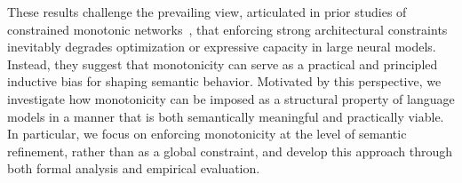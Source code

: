 \documentclass{article}
\theoremstyle{plain}
\theoremstyle{definition}
\theoremstyle{remark}
\begin{document}

These results challenge the prevailing view, articulated in prior studies of constrained monotonic networks~\cite{sartor2025advancing}, that enforcing strong architectural constraints inevitably degrades optimization or expressive capacity in large neural models. Instead, they suggest that monotonicity can serve as a practical and principled inductive bias for shaping semantic behavior. Motivated by this perspective, we investigate how monotonicity can be imposed as a structural property of language models in a manner that is both semantically meaningful and practically viable. In particular, we focus on enforcing monotonicity at the level of semantic refinement, rather than as a global constraint, and develop this approach through both formal analysis and empirical evaluation.


\end{document}
